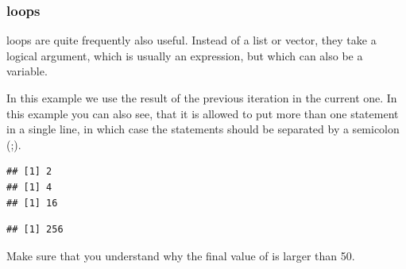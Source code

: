 \documentclass[krantz2]{krantz}\usepackage{knitr}%
\begin{document}
\subsubsection[\texttt{while} loops]{ loops}
 loops are quite frequently also useful. Instead of a list or vector, they take a logical argument, which is usually an expression, but which can also be a variable.

In this example we use the result of the previous iteration in the current one. In this example you can also see, that it is allowed to put more than one statement in a single line, in which case the statements should be separated by a semicolon (;).

\begin{knitrout}\footnotesize
{}\color{fgcolor}\begin{kframe}
\begin{alltt}
 \hlkwb{<-} 
  \hlopt{<} \hlstd{) \{} \hlkwb{<-} \hlopt{^}\hlstd{\}}
\end{alltt}
\begin{verbatim}
## [1] 2
## [1] 4
## [1] 16
\end{verbatim}
\begin{alltt}
\end{alltt}
\begin{verbatim}
## [1] 256
\end{verbatim}
\end{kframe}
\end{knitrout}

\begin{playground}
Make sure that you understand why the final value of  is larger than 50.
\end{playground}
\end{document}
